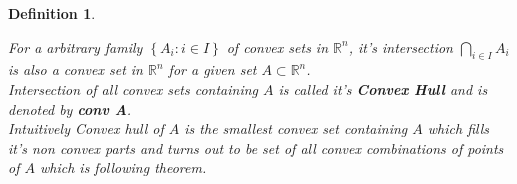 \documentclass[oneside]{book}
\newtheorem{mydef}{Definition}
\begin{document}
\begin{mydef}  \label{d:4}


For a arbitrary family  $\left\{A_{i}: i \in I\right\}$ of convex sets in   $\mathbb{R}^{n}$, it's intersection $\bigcap_{i \in I} A_{i}$ is also a convex set in $\mathbb{R}^{n}$  for a given set $A \subset \mathbb{R}^{n}$.\\ Intersection of all convex sets containing $A$ is called it's  \textbf{Convex Hull} and is denoted by  \textbf{conv A}.\\
 Intuitively Convex hull of $A$  is the smallest convex set containing $A$ which fills it's non convex parts and turns out to be set of all convex combinations of points of $A$ which is following theorem.
 
 \end{mydef}
 
 
\end{document}
